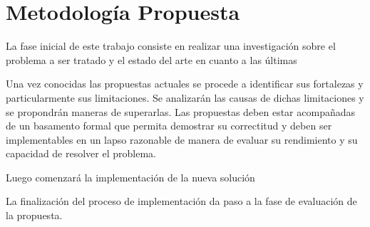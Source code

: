 \section{Metodología Propuesta}

La fase inicial de este trabajo consiste en realizar una investigación sobre el
problema a ser tratado y el estado del arte en cuanto a las últimas 

Una vez conocidas las propuestas actuales se procede a identificar sus
fortalezas y particularmente sus limitaciones. Se analizarán las causas de
dichas limitaciones y se propondrán maneras de superarlas. Las propuestas deben
estar acompañadas de un basamento formal que permita demostrar su correctitud y
deben ser implementables en un lapso razonable de manera de evaluar su
rendimiento y su capacidad de resolver el problema.

Luego comenzará la implementación de la nueva solución 

La finalización del proceso de implementación da paso a la fase de evaluación de
la propuesta.
